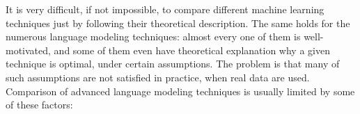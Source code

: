It is very difficult, if not impossible, to compare different machine learning techniques just by following their theoretical description. The same holds for the numerous language modeling techniques: almost every one of them is well-motivated, and some of them even have theoretical explanation why a given technique is optimal, under certain assumptions. The problem is that many of such assumptions are not satisfied in practice, when real data are used.
Comparison of advanced language modeling techniques is usually limited by some of these factors:

